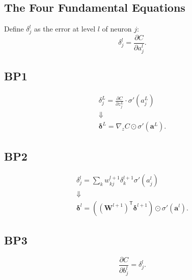 \documentclass[a4paper,9pt]{extarticle}
\begin{document}
\begin{multicols*}{2}
		\section{The Four Fundamental Equations}
		Define $\delta_{j}^{l}$ as the error at level $l$ of neuron $j$:
		\begin{equation*}
			\delta_{j}^{l}=\frac{\partial C}{\partial a^{l}_{j}}.
		\end{equation*}
		\subsection{BP1}
\begin{riquadro}
			\begin{equation*}
			\begin{array}{c}
				\delta_{j}^{L}=\frac{\partial C}{\partial z^{L}_{j}}\cdot\sigma'(a^{L}_{j})\\
				\Downarrow\\
				\boldsymbol{\delta}^{L}=\nabla_{z}C\odot\sigma'(\mathbf{a}^{L}).
			\end{array}
		\end{equation*}
\end{riquadro}
		\subsection{BP2}
	\begin{riquadro}
			\begin{equation*}
			\begin{array}{c}
				\delta_{j}^{l}=\sum_{k}w_{kj}^{l+1}\delta_k^{l+1}\sigma'(a^{l}_{j})\\
				\Downarrow\\
				\boldsymbol{\delta}^{l}=((\mathbf{W}^{l+1})^{\mathsf{T}}\boldsymbol{\delta}^{l+1})\odot\sigma'(\mathbf{a}^{l}).
			\end{array}
		\end{equation*}
	\end{riquadro}
		\subsection{BP3}
\begin{riquadro}
			\begin{equation*}
			\frac{\partial C}{\partial b_{j}^{l}}=\delta^{l}_{j}.
		\end{equation*}
\end{riquadro}

\end{multicols*}
\end{document}
